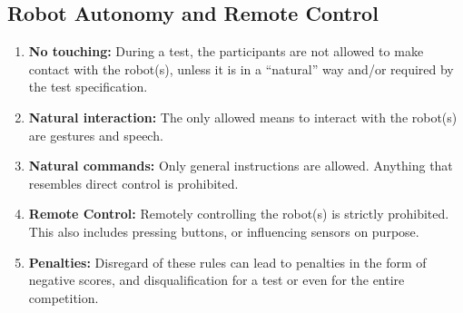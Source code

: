 \subsection{Robot Autonomy and Remote Control}
\begin{enumerate}
	\item \textbf{No touching:} During a test, the participants are not allowed to make contact with the robot(s), unless it is in a \enquote{natural} way and/or required by the test specification.
	\item \textbf{Natural interaction:} The only allowed means to interact with the robot(s) are gestures and speech.
	\item \textbf{Natural commands:} Only general instructions are allowed.
	Anything that resembles direct control is prohibited.
	\item \textbf{Remote Control:} Remotely controlling the robot(s) is strictly prohibited. This also includes pressing buttons, or influencing sensors on purpose.
	\item \textbf{Penalties:} Disregard of these rules can lead to penalties in the form of negative scores, and disqualification for a test or even for the entire competition.
\end{enumerate}

